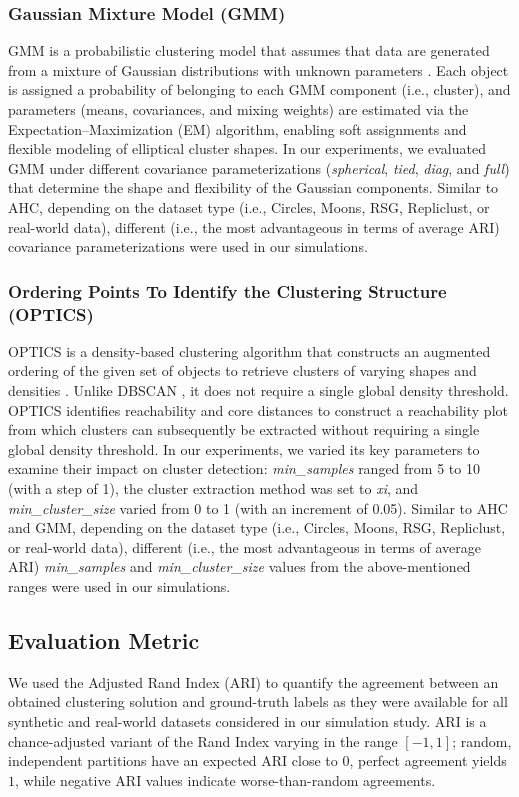 \documentclass[preprint,12pt]{elsarticle}
\begin{document}
\subsubsection{Gaussian Mixture Model (GMM)} GMM is a probabilistic clustering model that assumes that data are generated from a mixture of Gaussian distributions with unknown parameters \cite{wolfe1970pattern}. Each object is assigned a probability of belonging to each GMM component (i.e., cluster), and parameters (means, covariances, and 
mixing weights) are estimated via the Expectation–Maximization (EM) algorithm, enabling soft assignments and flexible modeling of elliptical cluster shapes. In our experiments, we evaluated GMM under different covariance parameterizations (\textit{spherical}, \textit{tied}, \textit{diag}, and \textit{full}) that determine the shape and flexibility of the Gaussian components. Similar to AHC, depending on the dataset type (i.e., Circles, Moons, RSG, Repliclust, or real-world data), different (i.e., the most advantageous in terms of average ARI) covariance parameterizations were used in our simulations.

\subsubsection{Ordering Points To Identify the Clustering Structure (OPTICS)} OPTICS is a density-based clustering algorithm that constructs an augmented ordering of the given set of objects to retrieve clusters of varying shapes and densities \cite{ankerst1999optics}. Unlike DBSCAN \cite{ester1996density}, it does not require a single global density threshold. OPTICS identifies reachability and core distances to construct a reachability plot from which clusters can subsequently be extracted without requiring a single global density threshold. In our experiments, we varied its key parameters to examine their impact on cluster detection: \textit{min\_samples} ranged from 5 to 10 (with a step of 1), the cluster extraction method was set to \textit{xi}, and \textit{min\_cluster\_size} varied from 0 to 1 (with an increment of 0.05). Similar to AHC and GMM, depending on the dataset type (i.e., Circles, Moons, RSG, Repliclust, or real-world data), different (i.e., the most advantageous in terms of average ARI) \textit{min\_samples} and \textit{min\_cluster\_size} values from the above-mentioned ranges were used in our simulations.

\subsection{Evaluation Metric} \label{subsec:ari}
We used the Adjusted Rand Index (ARI) \cite{hubert1985comparing} to quantify the agreement between an obtained clustering solution and ground-truth labels as they were available for all synthetic and real-world datasets considered in our simulation study. ARI is a chance-adjusted variant of the Rand Index varying in the range $[-1,1]$; random, independent partitions have an expected ARI close to $0$, perfect agreement yields $1$, while negative ARI values indicate worse-than-random agreements.
\end{document}
